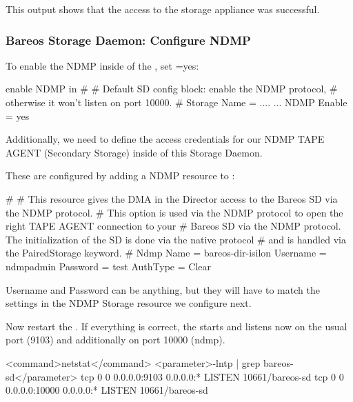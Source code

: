 This output shows that the access to the storage appliance was successful.



\subsubsection{Bareos Storage Daemon: Configure NDMP}
\label{sec:ndmp-sd-configure}


To enable the NDMP \TapeAgent inside of the \bareosSd,
set =yes:

\begin{bconfig}{enable NDMP in \bareosSd}
#
# Default SD config block: enable the NDMP protocol,
# otherwise it won't listen on port 10000.
#
Storage {
   Name = ....
   ...
   NDMP Enable = yes
}
\end{bconfig}



Additionally, we need to define the access credentials for our NDMP TAPE AGENT (Secondary Storage) inside of this Storage Daemon.

These are configured by adding a NDMP resource to :

\begin{bconfig}{}
#
# This resource gives the DMA in the Director access to the Bareos SD via the NDMP protocol.
# This option is used via the NDMP protocol to open the right TAPE AGENT connection to your
# Bareos SD via the NDMP protocol. The initialization of the SD is done via the native protocol
# and is handled via the PairedStorage keyword.
#
Ndmp {
  Name = bareos-dir-isilon
  Username = ndmpadmin
  Password = test
  AuthType = Clear
}
\end{bconfig}

Username and Password can be anything, but they will have to match the settings in the \bareosDir NDMP Storage resource we configure next.

Now restart the \bareosSd.
If everything is correct, the \bareosSd starts and listens now on the usual port (9103) and additionally on port 10000 (ndmp).

\begin{commands}{}
<command>netstat</command> <parameter>-lntp | grep bareos-sd</parameter>
tcp        0      0 0.0.0.0:9103            0.0.0.0:*               LISTEN      10661/bareos-sd
tcp        0      0 0.0.0.0:10000           0.0.0.0:*               LISTEN      10661/bareos-sd
\end{commands}{}


